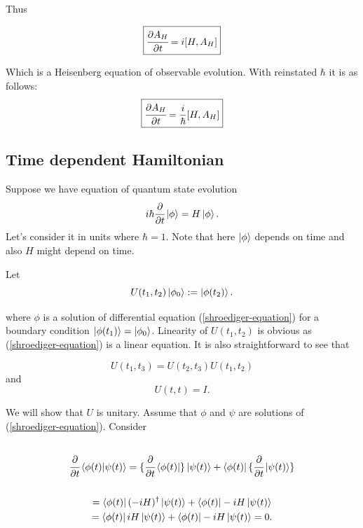 \documentclass[main.tex]{subfiles}
\begin{document}
Thus

\begin{equation}
\label{time-independent-heisenberg}
\boxed{
\cfrac{\partial A_H}{\partial t} = i[H,A_H]
}
\end{equation}

Which is a Heisenberg equation of observable evolution.
With reinstated $\hbar$ it is as follows:
\begin{equation}
\boxed{
\cfrac{\partial A_H}{\partial t} = \frac{i}{\hbar}[H, A_H]
}
\end{equation}

\subsection{Time dependent Hamiltonian}

Suppose we have equation of quantum state evolution
\begin{equation}
\label{shroediger-equation}
i\hbar\cfrac{\partial}{\partial t} \ket{\phi} = H\ket{\phi}.
\end{equation}
Let's consider it in units where $\hbar = 1$. Note that here $\ket{\phi}$ depends on time and also $H$ might depend on time.

Let 
\begin{equation}
U(t_1, t_2)\ket{\phi_0} := \ket{\phi(t_2)}.
\end{equation}

where $\phi$ is a solution of differential equation (\ref{shroediger-equation}) for a boundary condition $\ket{\phi(t_1)} = \ket{\phi_0}$. Linearity of $U(t_1, t_2)$ is obvious as (\ref{shroediger-equation}) is a linear equation. It is also straightforward to see that 

\begin{equation}
U(t_1,t_3) = U(t_2, t_3)U(t_1, t_2)
\end{equation}
and
\begin{equation}
U(t, t) = I.
\end{equation}

We will show that $U$ is unitary.
Assume that $\phi$ and $\psi$ are solutions of (\ref{shroediger-equation}). Consider
\begin{multline*}
\\
\cfrac{\partial}{\partial t} \bra{\phi(t)}\ket{\psi(t)} = \{\cfrac{\partial}{\partial t} \bra{\phi(t)}\}\ket{\psi(t)} + \bra{\phi(t)}\{\cfrac{\partial}{\partial t} \ket{\psi(t)}\}\\
\\ = \bra{\phi(t)} (-iH)^\dag \ket{\psi(t)} + \bra{\phi(t)} -iH \ket{\psi(t)}
\\ = \bra{\phi(t)} iH \ket{\psi(t)} +  \bra{\phi(t)} -iH \ket{\psi(t)} = 0.
\\
\end{multline*}
\end{document}
